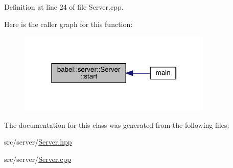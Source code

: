 Definition at line 24 of file Server.\+cpp.

Here is the caller graph for this function\+:\nopagebreak
\begin{figure}[H]
\begin{center}
\leavevmode
\includegraphics[width=262pt]{classbabel_1_1server_1_1_server_aa050ebb98ff73cb5be7c6c6854363f18_icgraph}
\end{center}
\end{figure}


The documentation for this class was generated from the following files\+:\begin{DoxyCompactItemize}
\item 
src/server/\mbox{\hyperlink{_server_8hpp}{Server.\+hpp}}\item 
src/server/\mbox{\hyperlink{_server_8cpp}{Server.\+cpp}}\end{DoxyCompactItemize}
